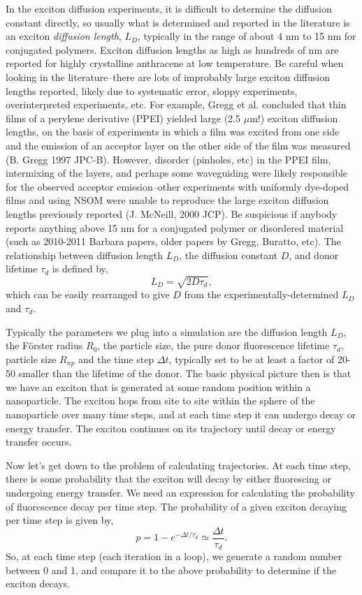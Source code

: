 \documentclass[12pt]{article}
\begin{document}
In the exciton diffusion experiments, it is difficult to determine the
diffusion constant directly, so usually what is determined and
reported in the literature is an exciton {\em diffusion length},
$L_D$, typically in the range of about 4 nm to 15 nm for conjugated
polymers.  Exciton diffusion lengths as high as hundreds of nm are
reported for highly crystalline anthracene at low temperature.  Be
careful when looking in the literature--there are lots of improbably
large exciton diffusion lengths reported, likely due to systematic
error, sloppy experiments, overinterpreted experiments, etc.  For
example, Gregg et al. concluded that thin films of a perylene
derivative (PPEI) yielded large (2.5 $\mu$m!) exciton diffusion
lengths, on the basis of experiments in which a film was excited from
one side and the emission of an acceptor layer on the other side of
the film was measured (B. Gregg 1997 JPC-B).  However, disorder
(pinholes, etc) in the PPEI film, intermixing of the layers, and
perhaps some waveguiding were likely responsible for the observed
acceptor emission--other experiments with uniformly dye-doped films
and using NSOM were unable to reproduce the large exciton diffusion
lengths previously reported (J. McNeill, 2000 JCP).  Be suspicious if
anybody reports anything above 15 nm for a conjugated polymer or
disordered material (such as 2010-2011 Barbara papers, older papers by
Gregg, Buratto, etc).  The relationship between diffusion length
$L_D$, the diffusion constant $D$, and donor lifetime $\tau_d$ is
defined by,
%
$$
L_D = \sqrt{2 D \tau_d},
$$
%
which can be easily rearranged to give $D$ from the
experimentally-determined $L_D$ and $\tau_d$.

Typically the parameters we plug into a simulation are the diffusion
length $L_D$, the F\" orster radius $R_0$, the particle size, the
pure donor fluorescence lifetime $\tau_d$, particle size $R_{np}$
and the time step $\Delta t$, typically set to be at least a factor of
20-50 smaller than the lifetime of the donor.  The basic physical
picture then is that we have an exciton that is generated at some
random position within a nanoparticle.  The exciton hops from site to
site within the sphere of the nanoparticle over many time steps, and
at each time step it can undergo decay or energy transfer.  The
exciton continues on its trajectory until decay or energy transfer
occurs.

Now let's get down to the problem of calculating trajectories.  At
each time step, there is some probability that the exciton will decay
by either fluorescing or undergoing energy transfer. We need an
expression for calculating the probability of fluorescence decay per
time step.  The probability of a given exciton decaying per time step
is given by,
%
$$
p=1-e^{-\Delta t/\tau_d} \simeq \frac{\Delta t}{\tau_d}.
$$
%
So, at each time step (each iteration in a loop), we generate a random
number between 0 and 1, and compare it to the above probability to
determine if the exciton decays.
\end{document}
